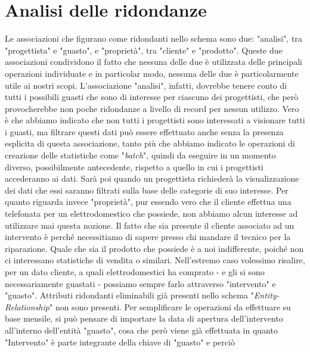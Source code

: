 \documentclass[a4paper, 12pt]{report}
\begin{document}
\newpage

\section{Analisi delle ridondanze}

Le associazioni che figurano come ridondanti nello schema sono due: "analisi", tra "progettista" e "guasto", e "proprietà", tra "cliente" e "prodotto". Queste due associazioni
condividono il fatto che nessuna delle due è utilizzata delle principali operazioni individuate e in particolar modo, nessuna delle due è particolarmente utile ai nostri scopi.\newline
L'associazione "analisi", infatti, dovrebbe tenere conto di tutti i possibili guasti che sono di interesse per ciascuno dei progettisti, che però provocherebbe non poche ridondanze
a livello di record per nessun utilizzo. Vero è che abbiamo indicato che non tutti i progettisti sono interessati a visionare tutti i guasti, ma filtrare questi dati può essere effettuato
anche senza la presenza esplicita di questa associazione, tanto più che abbiamo indicato le operazioni di creazione delle statistiche come "\textit{batch}", quindi da eseguire in
un momento diverso, possibilmente antecedente, rispetto a quello in cui i progettisti accederanno ai dati. Sarà poi quando un progettista richiederà la visualizzazione dei dati che
essi saranno filtrati sulla base delle categorie di suo interesse.\newline
Per quanto riguarda invece "proprietà", pur essendo vero che il cliente effettua una telefonata per un elettrodomestico che possiede, non abbiamo alcun interesse ad utilizzare mai
questa nozione. Il fatto che sia presente il cliente associato ad un intervento è perché necessitiamo di sapere presso chi mandare il tecnico per la riparazione. Quale che sia il prodotto
che possiede è a noi indifferente, poiché non ci interessano statistiche di vendita o similari. Nell'estremo caso volessimo risalire, per un dato cliente, a quali elettrodomestici
ha comprato - e gli si sono necessariamente guastati - possiamo sempre farlo attraverso "intervento" e "guasto".\newline
Attributi ridondanti eliminabili già presenti nello schema "\textit{Entity-Relationship}" non sono presenti. Per semplificare le operazioni da effettuare su base mensile, si può pensare di importare la data di apertura dell'intervento all'interno dell'entità "guasto", cosa che però viene già effettuata in quanto "Intervento" è parte integrante della chiave di "guasto" e perciò
\end{document}
